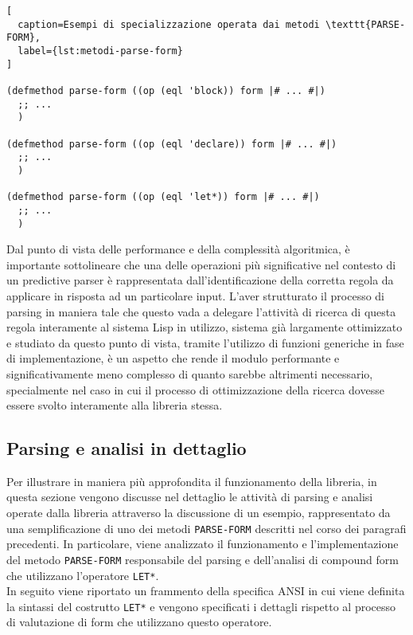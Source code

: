 \begin{lstlisting}[
  caption=Esempi di specializzazione operata dai metodi \texttt{PARSE-FORM},
  label={lst:metodi-parse-form}
]

(defmethod parse-form ((op (eql 'block)) form |# ... #|)
  ;; ...
  )

(defmethod parse-form ((op (eql 'declare)) form |# ... #|)
  ;; ...
  )

(defmethod parse-form ((op (eql 'let*)) form |# ... #|)
  ;; ...
  )

\end{lstlisting}

Dal punto di vista delle performance e della complessità algoritmica, è
importante sottolineare che una delle operazioni più significative nel contesto
di un predictive parser è rappresentata dall’identificazione della corretta
regola da applicare in risposta ad un particolare input. L’aver strutturato il
processo di parsing in maniera tale che questo vada a delegare l'attività di
ricerca di questa regola interamente al sistema Lisp in utilizzo, sistema già
largamente ottimizzato e studiato da questo punto di vista, tramite l’utilizzo
di funzioni generiche in fase di implementazione, è un aspetto che rende il
modulo performante e significativamente meno complesso di quanto sarebbe
altrimenti necessario, specialmente nel caso in cui il processo di
ottimizzazione della ricerca dovesse essere svolto interamente alla libreria
stessa.

\subsection{Parsing e analisi in dettaglio}

Per illustrare in maniera più approfondita il funzionamento della libreria, in
questa sezione vengono discusse nel dettaglio le attività di parsing e analisi
operate dalla libreria attraverso la discussione di un esempio, rappresentato da
una semplificazione di uno dei metodi \texttt {PARSE-FORM} descritti nel corso
dei paragrafi precedenti. In particolare, viene analizzato il funzionamento e
l'implementazione del metodo \texttt{PARSE-FORM} responsabile del parsing e
dell'analisi di compound form che utilizzano l’operatore \texttt{LET*}.\\

In seguito viene riportato un frammento della specifica ANSI in cui viene
definita la sintassi del costrutto \texttt{LET*} e vengono specificati i
dettagli rispetto al processo di valutazione di form che utilizzano questo
operatore.


